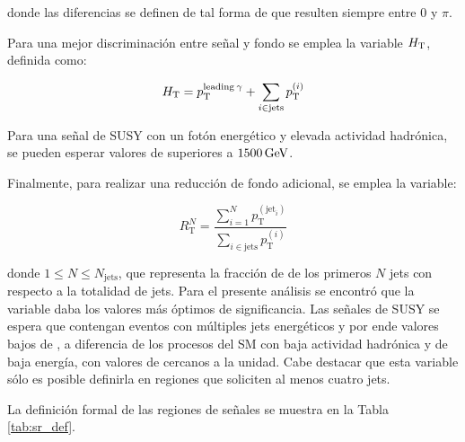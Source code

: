 \noindent
donde las diferencias se definen de tal forma de que resulten siempre entre $0$ y $\pi$.

Para una mejor discriminación entre señal y fondo se emplea la variable $H_{\text{T}}$, definida como:

\begin{equation}
  H_{\text{T}} = p_{\text{T}}^{\text{leading}\: \gamma} + \sum_{i \in \text{jets}} p_{\text{T}}^{(i)}
\end{equation}

Para una señal de SUSY con un fotón energético y elevada actividad hadrónica, se pueden esperar valores de \HT superiores a $1500\,\text{GeV}$.

Finalmente, para realizar una reducción de fondo adicional, se emplea la variable:

\begin{equation}
  R_{\text{T}}^{N} = \frac{\sum_{i=1}^{N} p_{\text{T}}^{(\text{jet}_i)}}{\sum_{i \in \text{jets}} p_{\text{T}}^{(i)}}
\end{equation}

\noindent
donde $1\le N \le N_{\text{jets}}$, que representa la fracción de \pt de los primeros $N$ jets con respecto a la totalidad de jets. Para el presente análisis se encontró que la variable \rtf daba los valores más óptimos de significancia. Las señales de SUSY se espera que contengan eventos con múltiples jets energéticos y por ende valores bajos de \rtf, a diferencia de los procesos del SM con baja actividad hadrónica y de baja energía, con valores de \rtf cercanos a la unidad. Cabe destacar que esta variable sólo es posible definirla en regiones que soliciten al menos cuatro jets.


La definición formal de las regiones de señales se muestra en la Tabla \ref{tab:sr_def}.

